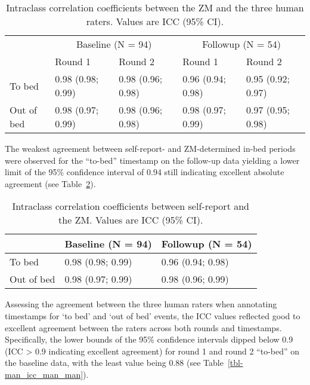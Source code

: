 \documentclass[
  10pt,
]{scrbook}
\begin{document}
\begingroup

\footnotesize

\hypertarget{tbl-man_icc_zm_man}{}
\begin{longtable}{lllll}
\caption{\label{tbl-man_icc_zm_man}Intraclass correlation coefficients between the ZM and the three human
raters. Values are ICC (95\% CI). }\tabularnewline

\toprule
 & \multicolumn{2}{c}{Baseline (N = 94)} & \multicolumn{2}{c}{Followup (N = 54)} \\ 
\cmidrule(lr){2-3} \cmidrule(lr){4-5}
 & Round 1 & Round 2 & Round 1 & Round 2 \\ 
\midrule
To bed & 0.98 (0.98; 0.99) & 0.98 (0.96; 0.98) & 0.96 (0.94; 0.98) & 0.95 (0.92; 0.97) \\ 
Out of bed & 0.98 (0.97; 0.99) & 0.98 (0.96; 0.98) & 0.98 (0.97; 0.99) & 0.97 (0.95; 0.98) \\ 
\bottomrule
\end{longtable}

\endgroup

The weakest agreement between self-report- and ZM-determined in-bed
periods were observed for the ``to-bed'' timestamp on the follow-up data
yielding a lower limit of the 95\% confidence interval of 0.94 still
indicating excellent absolute agreement (see
Table~\ref{tbl-man_icc_zm_self}).

\pagebreak

\begingroup

\footnotesize

\hypertarget{tbl-man_icc_zm_self}{}
\begin{longtable}{lll}
\caption{\label{tbl-man_icc_zm_self}Intraclass correlation coefficients between self-report and the ZM.
Values are ICC (95\% CI). }\tabularnewline

\toprule
 & Baseline (N = 94) & Followup (N = 54) \\ 
\midrule
To bed & 0.98 (0.98; 0.99) & 0.96 (0.94; 0.98) \\ 
Out of bed & 0.98 (0.97; 0.99) & 0.98 (0.96; 0.99) \\ 
\bottomrule
\end{longtable}

\endgroup

Assessing the agreement between the three human raters when annotating
timestamps for `to bed' and `out of bed' events, the ICC values
reflected good to excellent agreement between the raters across both
rounds and timestamps. Specifically, the lower bounds of the 95\%
confidence intervals dipped below 0.9 (ICC \textgreater{} 0.9 indicating
excellent agreement) for round 1 and round 2 ``to-bed'' on the baseline
data, with the least value being 0.88 (see
Table~\ref{tbl-man_icc_man_man}).
\end{document}
